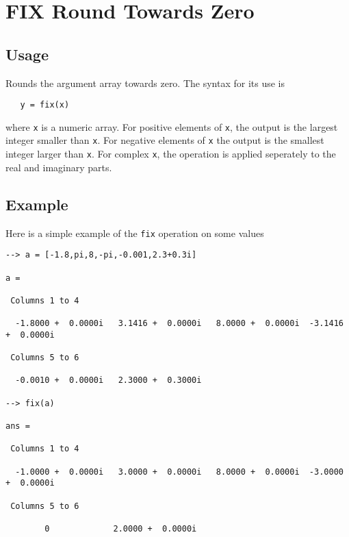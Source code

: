 \section{FIX Round Towards Zero}

\subsection{Usage}

Rounds the argument array towards zero.  The syntax for its use is
\begin{verbatim}
   y = fix(x)
\end{verbatim}
where \verb|x| is a numeric array.  For positive elements of \verb|x|, the output
is the largest integer smaller than \verb|x|.  For negative elements of \verb|x|
the output is the smallest integer larger than \verb|x|.  For complex \verb|x|,
the operation is applied seperately to the real and imaginary parts.
\subsection{Example}

Here is a simple example of the \verb|fix| operation on some values
\begin{verbatim}
--> a = [-1.8,pi,8,-pi,-0.001,2.3+0.3i]

a = 

 Columns 1 to 4

  -1.8000 +  0.0000i   3.1416 +  0.0000i   8.0000 +  0.0000i  -3.1416 +  0.0000i 

 Columns 5 to 6

  -0.0010 +  0.0000i   2.3000 +  0.3000i 

--> fix(a)

ans = 

 Columns 1 to 4

  -1.0000 +  0.0000i   3.0000 +  0.0000i   8.0000 +  0.0000i  -3.0000 +  0.0000i 

 Columns 5 to 6

        0             2.0000 +  0.0000i 
\end{verbatim}
